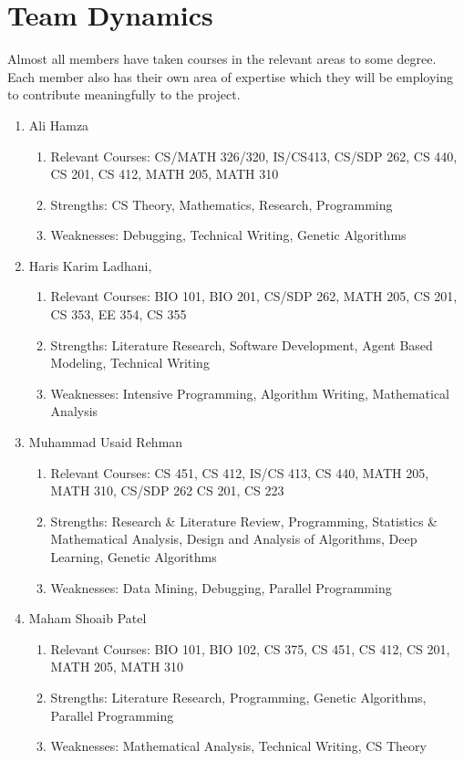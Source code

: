 \documentclass[11pt]{article}
\begin{document}

\newpage
\section{Team Dynamics}
\label{lblTeam}

Almost all members have taken courses in the relevant areas to some degree. 
Each member also has their own area of expertise which they will be 
employing to contribute meaningfully to the project.
\begin{enumerate}
    \item Ali Hamza
    \begin{enumerate}
        \item Relevant Courses: CS/MATH 326/320, IS/CS413, CS/SDP 262, CS 440, CS 201, CS 412, MATH 205, MATH 310
        \item Strengths: CS Theory, Mathematics, Research, Programming
        \item Weaknesses: Debugging, Technical Writing, Genetic Algorithms
    \end{enumerate} 
    \item Haris Karim Ladhani,
    \begin{enumerate}
        \item Relevant Courses: BIO 101, BIO 201, CS/SDP 262, MATH 205, CS 201, CS 353, EE 354, CS 355
        \item Strengths: Literature Research, Software Development, Agent Based Modeling, Technical Writing 
        \item Weaknesses: Intensive Programming, Algorithm Writing, Mathematical Analysis
    \end{enumerate} 
    \item Muhammad Usaid Rehman
    \begin{enumerate}
        \item Relevant Courses: CS 451, CS 412, IS/CS 413, CS 440, MATH 205, MATH 310, CS/SDP 262
        CS 201, CS 223
        \item Strengths: Research \& Literature Review, Programming,
        Statistics \& Mathematical Analysis, Design and Analysis of 
        Algorithms, Deep Learning, Genetic Algorithms
        \item Weaknesses: Data Mining, Debugging, Parallel Programming 
    \end{enumerate} 
    \item Maham Shoaib Patel
    \begin{enumerate}
        \item Relevant Courses: BIO 101, BIO 102, CS 375, CS 451, CS 412, CS 201, MATH 205, MATH 310
        \item Strengths: Literature Research, Programming, Genetic Algorithms, Parallel Programming
        \item Weaknesses: Mathematical Analysis, Technical Writing, CS Theory
    \end{enumerate} 
\end{enumerate}
\end{document}
